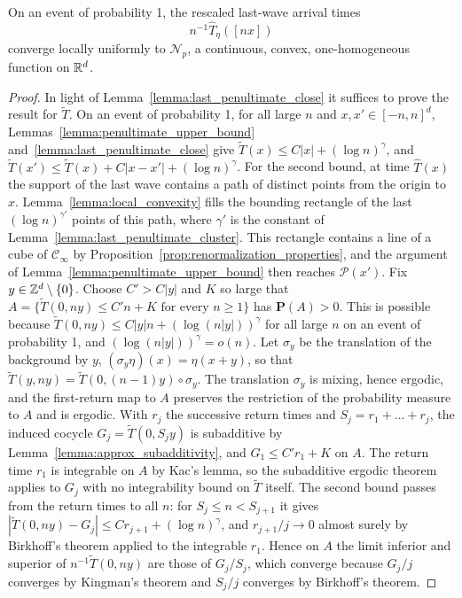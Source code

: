 \documentclass[12pt]{amsart}
\begin{document}
\begin{prop} \label{prop:convergence_of_the_last_wave}
	On an event of probability 1, the rescaled last-wave arrival times 
	\[
	n^{-1} \hat{T}_{\eta}([n x])
	\] 
	converge locally uniformly to $\mathcal{N}_{p}$, a continuous, convex, one-homogeneous function on $\mathbb{R}^d$. 
\end{prop}
\begin{proof}
	In light of Lemma~\ref{lemma:last_penultimate_close} it suffices to prove the result for $\tilde{T}$. On an event of probability 1, for all large $n$ and $x,x'\in[-n,n]^d$, Lemmas~\ref{lemma:penultimate_upper_bound} and~\ref{lemma:last_penultimate_close} give $\tilde{T}(x)\leq C|x|+(\log n)^{\gamma}$, and $\tilde{T}(x')\leq\tilde{T}(x)+C|x-x'|+(\log n)^{\gamma}$.
	For the second bound, at time $\hat{T}(x)$ the support of the last wave contains a path of distinct points from the origin to $x$. Lemma~\ref{lemma:local_convexity} fills the bounding rectangle of the last $(\log n)^{\gamma'}$ points of this path, where $\gamma'$ is the constant of Lemma~\ref{lemma:last_penultimate_cluster}. This rectangle contains a line of a cube of $\mathcal{C}_{\infty}$ by Proposition~\ref{prop:renormalization_properties}, and the argument of Lemma~\ref{lemma:penultimate_upper_bound} then reaches $\mathcal{P}(x')$.
	Fix $y\in\mathbb{Z}^d\setminus\{0\}$. Choose $C'>C|y|$ and $K$ so large that $A=\{\tilde{T}(0,ny)\leq C'n+K \text{ for every } n\geq1\}$ has $\mathbf{P}(A)>0$. This is possible because $\tilde{T}(0,ny)\leq C|y|n+(\log(n|y|))^{\gamma}$ for all large $n$ on an event of probability 1, and $(\log(n|y|))^{\gamma}=o(n)$. Let $\sigma_y$ be the translation of the background by $y$, $(\sigma_y\eta)(x)=\eta(x+y)$, so that $\tilde{T}(y,ny)=\tilde{T}(0,(n-1)y)\circ\sigma_y$. The translation $\sigma_y$ is mixing, hence ergodic, and the first-return map to $A$ preserves the restriction of the probability measure to $A$ and is ergodic. With $r_j$ the successive return times and $S_j=r_1+\dots+r_j$, the induced cocycle $G_j=\tilde{T}(0,S_jy)$ is subadditive by Lemma~\ref{lemma:approx_subadditivity}, and $G_1\leq C'r_1+K$ on $A$. The return time $r_1$ is integrable on $A$ by Kac's lemma, so the subadditive ergodic theorem applies to $G_j$ with no integrability bound on $\tilde{T}$ itself.
	The second bound passes from the return times to all $n$: for $S_j\leq n<S_{j+1}$ it gives $|\tilde{T}(0,ny)-G_j|\leq C r_{j+1}+(\log n)^{\gamma}$, and $r_{j+1}/j\to0$ almost surely by Birkhoff's theorem applied to the integrable $r_1$. Hence on $A$ the limit inferior and superior of $n^{-1}\tilde{T}(0,ny)$ are those of $G_j/S_j$, which converge because $G_j/j$ converges by Kingman's theorem and $S_j/j$ converges by Birkhoff's theorem.

\end{proof}
\end{document}
